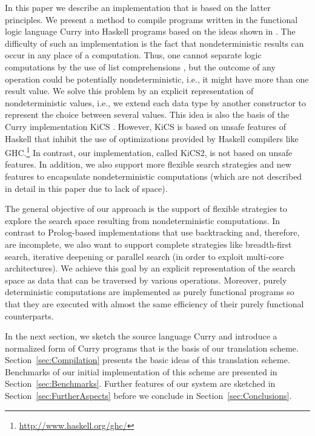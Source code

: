 \documentclass{llncs}
\begin{document}
In this paper we describe an implementation that is based
on the latter principles. We present a method to compile
programs written in the functional logic language Curry \cite{Hanus06Curry}
into Haskell programs based on the ideas shown
in \cite{BrasselFischer08IFL}.
The difficulty of such an implementation is the fact
that nondeterministic results can occur in any place of a
computation. Thus, one cannot separate logic computations
by the use of list comprehensions \cite{Wadler85},
but the outcome of any operation could be potentially nondeterministic,
i.e., it might have more than one result value.
We solve this problem by an explicit representation of
nondeterministic values, i.e., we extend each data type by
another constructor to represent the choice between several values.
This idea is also the basis of the Curry implementation KiCS
\cite{BrasselHuch07,BrasselHuch09}.
However, KiCS is based on unsafe features of Haskell
that inhibit the use of optimizations provided by Haskell compilers
like GHC.\footnote{\url{http://www.haskell.org/ghc/}}
In contrast, our implementation, called KiCS2, is not based on unsafe features.
In addition, we also support more flexible search strategies
and new features to encapsulate nondeterministic computations
(which are not described in detail in this paper due to lack of space).

The general objective of our approach is the support
of flexible strategies to explore the search space
resulting from nondeterministic computations.
In contrast to Prolog-based implementations
that use backtracking and, therefore, are incomplete,
we also want to support complete strategies like breadth-first search,
iterative deepening or parallel search (in order to exploit
multi-core architectures). We achieve this goal by an
explicit representation of the search space as data
that can be traversed by various operations.
Moreover, purely deterministic computations
are implemented as purely functional programs so that
they are executed with almost the same efficiency
of their purely functional counterparts.

In the next section, we sketch the source language Curry
and introduce a normalized form of Curry programs that is the
basis of our translation scheme.
Section~\ref{sec:Compilation} presents the basic ideas
of this translation scheme.
Benchmarks of our initial implementation of this scheme
are presented in Section~\ref{sec:Benchmarks}.
Further features of our system are sketched in
Section~\ref{sec:FurtherAspects}
before we conclude in Section~\ref{sec:Conclusions}.
\end{document}
